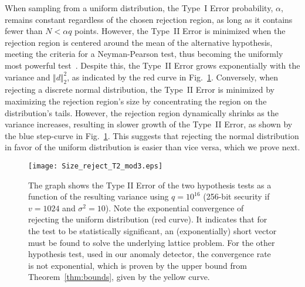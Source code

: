 \documentclass[journal, twoside, web]{ieeecolorpreprint}
\begin{document}
When sampling from a uniform distribution, the Type~I Error probability, $\alpha$, remains constant regardless of the chosen rejection region, as long as it contains fewer than $N<\alpha q$ points. However, the Type~II Error is minimized when the rejection region is centered around the mean of the alternative hypothesis, meeting the criteria for a Neyman-Pearson test, thus becoming the uniformly most powerful test~\cite{Lehmann2005}. Despite this, the Type~II Error grows exponentially with the variance and $\Vert d\Vert_2^2$, as indicated by the red curve in Fig.~\ref{fig:t2}. Conversely, when rejecting a discrete normal distribution, the Type~II Error is minimized by maximizing the rejection region's size by concentrating the region on the distribution's tails. However, the rejection region dynamically shrinks as the variance increases, resulting in slower growth of the Type~II Error, as shown by the blue step-curve in Fig.~\ref{fig:t2}. This suggests that rejecting the normal distribution in favor of the uniform distribution is easier than vice versa, which we prove next. %


\begin{figure}
\hspace{-20pt}
\texttt{[image: Size\_reject\_T2\_mod3.eps]}
    \caption{The graph shows the Type II Error of the two hypothesis tests as a function of the resulting variance using $q=10^{16}$ (256-bit security if $v=1024$ and $\sigma^2=10$). Note the exponential convergence of rejecting the uniform distribution (red curve). It indicates that for the test to be statistically significant, an (exponentially) short vector must be found to solve the underlying lattice problem. For the other hypothesis test, used in our anomaly detector, the convergence rate is not exponential, which is proven by the upper bound from Theorem~\ref{thm:bounds}, given by the yellow curve.}
    \label{fig:t2}
\end{figure}

\end{document}
